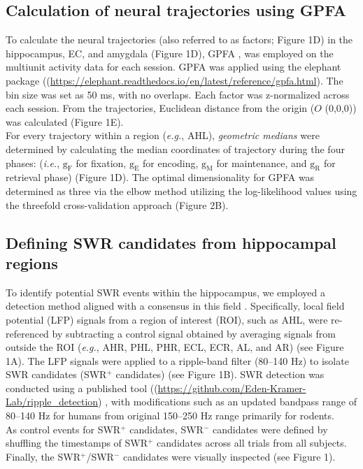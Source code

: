\documentclass[final,3p,times,twocolumn]{elsarticle}
\begin{document}
\subsection{Calculation of neural trajectories using GPFA}
To calculate the neural trajectories (also referred to as factors; Figure 1D) in the hippocampus, EC, and amygdala (Figure 1D), GPFA \cite{yu_gaussian-process_2009}, was employed on the multiunit activity data for each session. GPFA was applied using the elephant package ((\url{https://elephant.readthedocs.io/en/latest/reference/gpfa.html}). The bin size was set as 50 ms, with no overlaps. Each factor was z-normalized across each session. From the trajectories, Euclidean distance from the origin ($O$ (0,0,0)) was calculated (Figure 1E).
\\
\indent
For every trajectory within a region (\textit{e.g.}, AHL), \textit{geometric medians} were determined by calculating the median coordinates of trajectory during the four phases: (\textit{i.e.}, $\mathrm{g_{F}}$ for fixation, $\mathrm{g_{E}}$ for encoding, $\mathrm{g_{M}}$ for maintenance, and $\mathrm{g_{R}}$ for retrieval phase) (Figure 1D). The optimal dimensionality for GPFA was determined as three via the elbow method utilizing the log-likelihood values using the threefold cross-validation approach (Figure 2B).

\subsection{Defining SWR candidates from hippocampal regions}
To identify potential SWR events within the hippocampus, we employed a detection method aligned with a consensus in this field \cite{liu_consensus_2022}. Specifically, local field potential (LFP) signals from a region of interest (ROI), such as AHL, were re-referenced by subtracting a control signal obtained by averaging signals from outside the ROI (\textit{e.g.}, AHR, PHL, PHR, ECL, ECR, AL, and AR) (see Figure 1A). The LFP signals were applied to a ripple-band filter (80--140 Hz) to isolate SWR candidates (SWR$^+$ candidates) (see Figure 1B). SWR detection was conducted using a published tool ((\url{https://github.com/Eden-Kramer-Lab/ripple_detection}) \cite{kay_hippocampal_2016}, with modifications such as an updated bandpass range of 80--140 Hz for humans from original 150--250 Hz range primarily for rodents.
\\
\indent
As control events for SWR$^+$ candidates, SWR$^-$ candidates were defined by shuffling the timestamps of SWR$^+$ candidates across all trials from all subjects. Finally, the SWR$^+$/SWR$^-$ candidates were visually inspected (see Figure 1).
\end{document}
